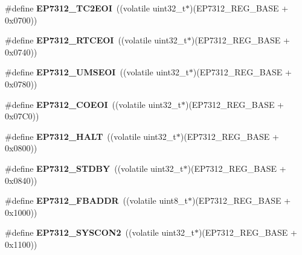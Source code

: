 \begin{DoxyCompactItemize}
\#define {\bfseries E\+P7312\+\_\+\+T\+C2\+E\+OI}~((volatile uint32\+\_\+t$\ast$)(E\+P7312\+\_\+\+R\+E\+G\+\_\+\+B\+A\+SE + 0x0700))
\item 
\mbox{\label{group__edb7312__registers_ga086d93c6405db90a6a95b8b4188cc1ef}} 
\#define {\bfseries E\+P7312\+\_\+\+R\+T\+C\+E\+OI}~((volatile uint32\+\_\+t$\ast$)(E\+P7312\+\_\+\+R\+E\+G\+\_\+\+B\+A\+SE + 0x0740))
\item 
\mbox{\label{group__edb7312__registers_gad99f16169b13a14916efb82b572d5e7c}} 
\#define {\bfseries E\+P7312\+\_\+\+U\+M\+S\+E\+OI}~((volatile uint32\+\_\+t$\ast$)(E\+P7312\+\_\+\+R\+E\+G\+\_\+\+B\+A\+SE + 0x0780))
\item 
\mbox{\label{group__edb7312__registers_gacefb138e0a0c6dc0dd4e07a15fc4503f}} 
\#define {\bfseries E\+P7312\+\_\+\+C\+O\+E\+OI}~((volatile uint32\+\_\+t$\ast$)(E\+P7312\+\_\+\+R\+E\+G\+\_\+\+B\+A\+SE + 0x07\+C0))
\item 
\mbox{\label{group__edb7312__registers_gadd6c3970f0e072402ea455a6b654d4d5}} 
\#define {\bfseries E\+P7312\+\_\+\+H\+A\+LT}~((volatile uint32\+\_\+t$\ast$)(E\+P7312\+\_\+\+R\+E\+G\+\_\+\+B\+A\+SE + 0x0800))
\item 
\mbox{\label{group__edb7312__registers_ga183438ced63be4027ed7b5c21285b9a1}} 
\#define {\bfseries E\+P7312\+\_\+\+S\+T\+D\+BY}~((volatile uint32\+\_\+t$\ast$)(E\+P7312\+\_\+\+R\+E\+G\+\_\+\+B\+A\+SE + 0x0840))
\item 
\mbox{\label{group__edb7312__registers_gac9c78c8c02179c3cceb076182e427076}} 
\#define {\bfseries E\+P7312\+\_\+\+F\+B\+A\+D\+DR}~((volatile uint8\+\_\+t$\ast$)(E\+P7312\+\_\+\+R\+E\+G\+\_\+\+B\+A\+SE + 0x1000))
\item 
\mbox{\label{group__edb7312__registers_ga1c79df026539f9c7fcf0301ed762e790}} 
\#define {\bfseries E\+P7312\+\_\+\+S\+Y\+S\+C\+O\+N2}~((volatile uint32\+\_\+t$\ast$)(E\+P7312\+\_\+\+R\+E\+G\+\_\+\+B\+A\+SE + 0x1100))
\item 
\mbox{\label{group__edb7312__registers_gace0a4e15ec5b0b08a3f564690c87e087}} 

\end{DoxyCompactItemize}
